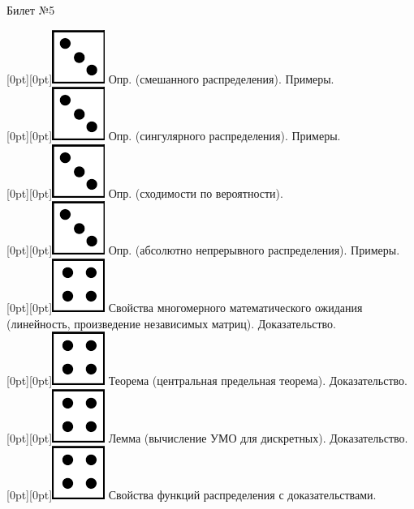 \documentclass[10pt]{article}
\begin{document}
\begin{center} {\Large Билет №5} \end{center} 

\raisebox{-1pt}[0pt][0pt]{\includegraphics[width=0.02\linewidth]{3.png}} Опр. (смешанного распределения). Примеры. \\

\raisebox{-1pt}[0pt][0pt]{\includegraphics[width=0.02\linewidth]{3.png}} Опр. (сингулярного распределения). Примеры. \\

\raisebox{-1pt}[0pt][0pt]{\includegraphics[width=0.02\linewidth]{3.png}} Опр. (сходимости по вероятности). \\

\raisebox{-1pt}[0pt][0pt]{\includegraphics[width=0.02\linewidth]{3.png}} Опр. (абсолютно непрерывного распределения). Примеры. \\

\raisebox{-1pt}[0pt][0pt]{\includegraphics[width=0.02\linewidth]{4.png}} Свойства многомерного математического ожидания (линейность, произведение независимых матриц). Доказательство. \\ 

\raisebox{-1pt}[0pt][0pt]{\includegraphics[width=0.02\linewidth]{4.png}} Теорема (центральная предельная теорема). Доказательство. \\        

\raisebox{-1pt}[0pt][0pt]{\includegraphics[width=0.02\linewidth]{4.png}} Лемма (вычисление УМО для дискретных). Доказательство. \\

\raisebox{-1pt}[0pt][0pt]{\includegraphics[width=0.02\linewidth]{4.png}} Свойства функций распределения с доказательствами. \\
\end{document}
